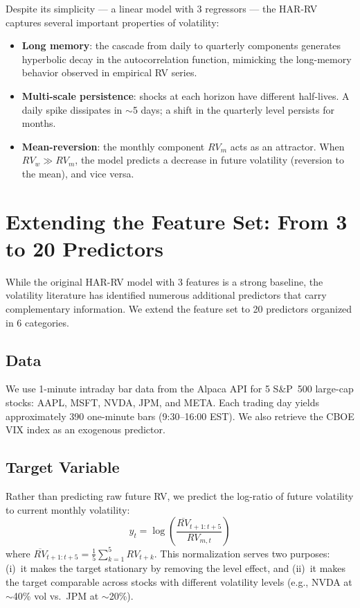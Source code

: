\documentclass[11pt,a4paper]{article}
\begin{document}
Despite its simplicity --- a linear model with 3 regressors --- the HAR-RV captures several important properties of volatility:
\begin{itemize}
    \item \textbf{Long memory}: the cascade from daily to quarterly components generates hyperbolic decay in the autocorrelation function, mimicking the long-memory behavior observed in empirical RV series.
    \item \textbf{Multi-scale persistence}: shocks at each horizon have different half-lives. A daily spike dissipates in $\sim$5 days; a shift in the quarterly level persists for months.
    \item \textbf{Mean-reversion}: the monthly component $RV_m$ acts as an attractor. When $RV_w \gg RV_m$, the model predicts a decrease in future volatility (reversion to the mean), and vice versa.
\end{itemize}

\section{Extending the Feature Set: From 3 to 20 Predictors}
\label{sec:features}

While the original HAR-RV model with 3 features is a strong baseline, the volatility literature has identified numerous additional predictors that carry complementary information. We extend the feature set to 20 predictors organized in 6 categories.

\subsection{Data}

We use 1-minute intraday bar data from the Alpaca API for 5 S\&P~500 large-cap stocks: AAPL, MSFT, NVDA, JPM, and META. Each trading day yields approximately 390 one-minute bars (9:30--16:00 EST). We also retrieve the CBOE VIX index as an exogenous predictor.

\subsection{Target Variable}

Rather than predicting raw future RV, we predict the log-ratio of future volatility to current monthly volatility:
\begin{equation}
    y_t = \log\left(\frac{\overline{RV}_{t+1:t+5}}{RV_{m,t}}\right)
    \label{eq:target}
\end{equation}
where $\overline{RV}_{t+1:t+5} = \frac{1}{5}\sum_{k=1}^{5} RV_{t+k}$. This normalization serves two purposes: (i)~it makes the target stationary by removing the level effect, and (ii)~it makes the target comparable across stocks with different volatility levels (e.g., NVDA at $\sim$40\% vol vs.\ JPM at $\sim$20\%).
\end{document}
